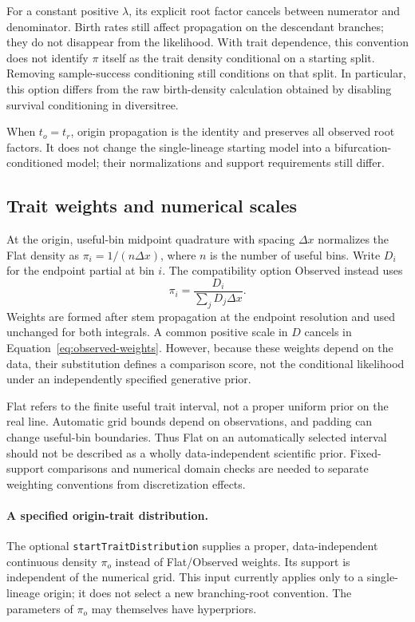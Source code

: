 \documentclass[11pt]{article}
\begin{document}
For a constant positive $\lambda$, its explicit root factor cancels between numerator and
denominator. Birth rates still affect propagation on the descendant branches; they do not
disappear from the likelihood. With trait dependence, this convention does not identify $\pi$
itself as the trait density conditional on a starting split. Removing sample-success conditioning
still conditions on that split. In particular, this option differs from the raw birth-density
calculation obtained by disabling survival conditioning in diversitree.

When $t_o=t_r$, origin propagation is the identity and preserves all observed root factors. It
does not change the single-lineage starting model into a bifurcation-conditioned model; their
normalizations and support requirements still differ.

\subsection{Trait weights and numerical scales}
At the origin, useful-bin midpoint quadrature with spacing $\Delta x$ normalizes the Flat density
as $\pi_i=1/(n\Delta x)$, where $n$ is the number of useful bins. Write $D_i$ for the
endpoint partial at bin $i$. The compatibility option Observed instead uses
\begin{equation}\label{eq:observed-weights}
 \pi_i=\frac{D_i}{\sum_j D_j\Delta x}.
\end{equation}
Weights are formed after stem propagation at the endpoint resolution and used unchanged for both
integrals. A common positive scale in $D$ cancels in Equation~\eqref{eq:observed-weights}. However,
because these weights depend on the data, their substitution defines a comparison score, not the
conditional likelihood under an independently specified generative prior.

Flat refers to the finite useful trait interval, not a proper uniform prior on the real line.
Automatic grid bounds depend on observations, and padding can change useful-bin boundaries.
Thus Flat on an automatically selected interval should not be described as a wholly
data-independent scientific prior. Fixed-support comparisons and numerical domain checks are
needed to separate weighting conventions from discretization effects.

\paragraph{A specified origin-trait distribution.}
The optional \texttt{startTraitDistribution} supplies a proper, data-independent continuous
density $\pi_o$ instead of Flat/Observed weights. Its support is independent of the numerical
grid. This input currently applies only to a single-lineage origin; it does not select a new
branching-root convention. The parameters of $\pi_o$ may themselves have hyperpriors.
\end{document}
